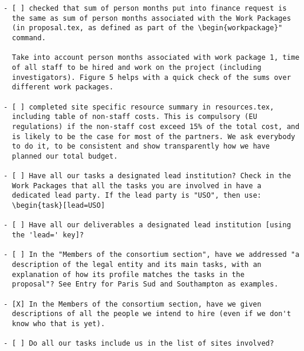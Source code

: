 \begin{draft}
\vspace{1cm}

\begin{verbatim}
- [ ] checked that sum of person months put into finance request is
  the same as sum of person months associated with the Work Packages
  (in proposal.tex, as defined as part of the \begin{workpackage}"
  command.
  
  Take into account person months associated with work package 1, time
  of all staff to be hired and work on the project (including
  investigators). Figure 5 helps with a quick check of the sums over
  different work packages.

- [ ] completed site specific resource summary in resources.tex,
  including table of non-staff costs. This is compulsory (EU
  regulations) if the non-staff cost exceed 15% of the total cost, and
  is likely to be the case for most of the partners. We ask everybody
  to do it, to be consistent and show transparently how we have
  planned our total budget.

- [ ] Have all our tasks a designated lead institution? Check in the
  Work Packages that all the tasks you are involved in have a
  dedicated lead party. If the lead party is "USO", then use:
  \begin{task}[lead=USO]

- [ ] Have all our deliverables a designated lead institution [using
  the 'lead=' key]?

- [ ] In the "Members of the consortium section", have we addressed "a
  description of the legal entity and its main tasks, with an
  explanation of how its profile matches the tasks in the
  proposal"? See Entry for Paris Sud and Southampton as examples.

- [X] In the Members of the consortium section, have we given
  descriptions of all the people we intend to hire (even if we don't
  know who that is yet). 
  
- [ ] Do all our tasks include us in the list of sites involved?
\end{verbatim}
\end{draft}

